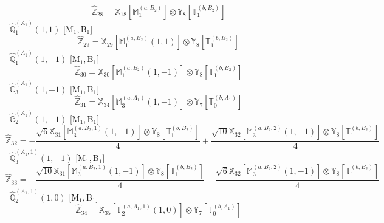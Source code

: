 \documentclass[fleqn,10pt,landscape]{article}
\begin{document}
\begin{itemize}
\begin{dmath*}
\hat{\mathbb{Z}}_{28}=\mathbb{X}_{18}[\mathbb{M}_{1}^{(a,B_{2})}] \otimes\mathbb{Y}_{8}[\mathbb{T}_{1}^{(b,B_{2})}]
\end{dmath*}
\vspace{4mm}
\noindent {} $\,\,\,\hat{\mathbb{Q}}_{1}^{(A_{1})}(1,1)$ [M$_{1}$,\,B$_{1}$]
\begin{dmath*}
\hat{\mathbb{Z}}_{29}=\mathbb{X}_{29}[\mathbb{M}_{1}^{(a,B_{2})}(1,1)] \otimes\mathbb{Y}_{8}[\mathbb{T}_{1}^{(b,B_{2})}]
\end{dmath*}
\vspace{4mm}
\noindent {} $\,\,\,\hat{\mathbb{Q}}_{1}^{(A_{1})}(1,-1)$ [M$_{1}$,\,B$_{1}$]
\begin{dmath*}
\hat{\mathbb{Z}}_{30}=\mathbb{X}_{30}[\mathbb{M}_{1}^{(a,B_{2})}(1,-1)] \otimes\mathbb{Y}_{8}[\mathbb{T}_{1}^{(b,B_{2})}]
\end{dmath*}
\vspace{4mm}
\noindent {} $\,\,\,\hat{\mathbb{G}}_{3}^{(A_{1})}(1,-1)$ [M$_{1}$,\,B$_{1}$]
\begin{dmath*}
\hat{\mathbb{Z}}_{31}=\mathbb{X}_{34}[\mathbb{M}_{3}^{(a,A_{1})}(1,-1)] \otimes\mathbb{Y}_{7}[\mathbb{T}_{0}^{(b,A_{1})}]
\end{dmath*}
\vspace{4mm}
\noindent {} $\,\,\,\hat{\mathbb{G}}_{2}^{(A_{1})}(1,-1)$ [M$_{1}$,\,B$_{1}$]
\begin{dmath*}
\hat{\mathbb{Z}}_{32}=- \frac{\sqrt{6} \mathbb{X}_{31}[\mathbb{M}_{3}^{(a,B_{2},1)}(1,-1)] \otimes\mathbb{Y}_{8}[\mathbb{T}_{1}^{(b,B_{2})}]}{4} + \frac{\sqrt{10} \mathbb{X}_{32}[\mathbb{M}_{3}^{(a,B_{2},2)}(1,-1)] \otimes\mathbb{Y}_{8}[\mathbb{T}_{1}^{(b,B_{2})}]}{4}
\end{dmath*}
\vspace{4mm}
\noindent {} $\,\,\,\hat{\mathbb{Q}}_{3}^{(A_{1},1)}(1,-1)$ [M$_{1}$,\,B$_{1}$]
\begin{dmath*}
\hat{\mathbb{Z}}_{33}=- \frac{\sqrt{10} \mathbb{X}_{31}[\mathbb{M}_{3}^{(a,B_{2},1)}(1,-1)] \otimes\mathbb{Y}_{8}[\mathbb{T}_{1}^{(b,B_{2})}]}{4} - \frac{\sqrt{6} \mathbb{X}_{32}[\mathbb{M}_{3}^{(a,B_{2},2)}(1,-1)] \otimes\mathbb{Y}_{8}[\mathbb{T}_{1}^{(b,B_{2})}]}{4}
\end{dmath*}
\vspace{4mm}
\noindent {} $\,\,\,\hat{\mathbb{Q}}_{2}^{(A_{1},1)}(1,0)$ [M$_{1}$,\,B$_{1}$]
\begin{dmath*}
\hat{\mathbb{Z}}_{34}=\mathbb{X}_{35}[\mathbb{T}_{2}^{(a,A_{1},1)}(1,0)] \otimes\mathbb{Y}_{7}[\mathbb{T}_{0}^{(b,A_{1})}]

\end{dmath*}
\end{itemize}
\end{document}
